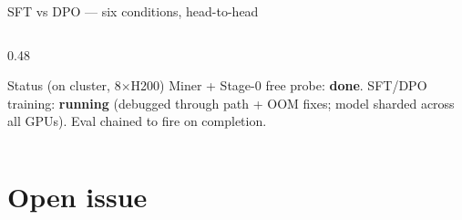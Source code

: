 \documentclass[10pt,aspectratio=169]{beamer}
\begin{document}
\begin{frame}{SFT vs DPO --- six conditions, head-to-head}
\begin{columns}[T]
\begin{column}{0.48\textwidth}
\begin{block}{Status (on cluster, 8$\times$H200)}
{\footnotesize
Miner + Stage-0 free probe: \textbf{done}. SFT/DPO training: \textbf{running}
(debugged through path + OOM fixes; model sharded across all GPUs).
Eval chained to fire on completion.}
\end{block}

\end{column}
\end{columns}

\end{frame}

\section{Open issue}
\end{document}
